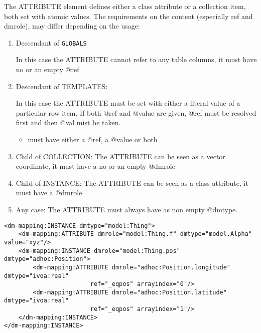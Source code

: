 
The ATTRIBUTE element defines either a class attribute or a collection item, both set with atomic values.
The requirements on
the content (especially ref and dmrole), may differ depending on
the usage:


\begin{enumerate}
\item Descendant of \texttt{GLOBALS}

  In this case the ATTRIBUTE cannot refer to any table columns, it must have no or an empty @ref
     
\item Descendant of TEMPLATES:

  In this case the ATTRIBUTE must be set with either a literal value of a particular row item.  If both @ref and @value are given, @ref must be resolved first and then @val mist be taken. 

  \begin{itemize}
     \item must have either a @ref, a @value or both 
  \end{itemize}  

\item Child of COLLECTION:
    The ATTRIBUTE can be seen as a vector coordinate, 
    it must have a no or an empty @dmrole
    
\item Child of INSTANCE: 
    The ATTRIBUTE can be seen as a class attribute, 
    it must have a @dmrole 
           
\item Any case:     
    The ATTRIBUTE must always have as non empty @dmtype.
\end{enumerate}  
    
    
\begin{lstlisting}[frame=single,caption={ATTRIBUTE examples},style=XML,basicstyle=\tiny]
<dm-mapping:INSTANCE dmtype="model:Thing">
    <dm-mapping:ATTRIBUTE dmrole="model:Thing.f" dmtype="model.Alpha" value="xyz"/>		
    <dm-mapping:INSTANCE dmrole="model:Thing.pos" dmtype="adhoc:Position">
        <dm-mapping:ATTRIBUTE dmrole="adhoc:Position.longitude" dmtype="ivoa:real" 
                        ref="_eqpos" arrayindex="0"/>
        <dm-mapping:ATTRIBUTE dmrole="adhoc:Position.latitude" dmtype="ivoa:real" 
                        ref="_eqpos" arrayindex="1"/>
    </dm-mapping:INSTANCE>
</dm-mapping:INSTANCE>
\end{lstlisting}  


